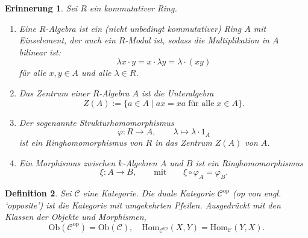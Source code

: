 \documentclass[a4paper, 11pt]{scrartcl}
\newcommand{\Hom}{\text{Hom}}
\newcommand{\Ob}{\text{Ob}}
\theoremstyle{basicstyle}
\newtheorem{definition}{Definition}[section]
\newtheorem{erinnerung}[definition]{Erinnerung}
\begin{document}
    \begin{erinnerung}
        Sei \(R\) ein kommutativer Ring.
        \begin{enumerate}
            \item Eine \emph{\(R\)-Algebra} ist ein (nicht unbedingt kommutativer) Ring \(A\) mit Einselement, der auch ein \(R\)-Modul ist, sodass die Multiplikation in \(A\) bilinear ist:
                \[\lambda x \cdot y = x \cdot \lambda y = \lambda \cdot (xy)\]
                für alle \(x,y \in A\) und alle \(\lambda \in R\).

            \item Das \emph{Zentrum} einer \(R\)-Algebra \(A\) ist die Unteralgebra
                \[Z(A) := \{a \in A \;\vert\; ax = xa \; \text{für alle} \; x \in A\}.\]

            \item Der sogenannte \emph{Strukturhomomorphismus} 
                \[\varphi: R \longrightarrow A, \qquad \lambda \mapsto \lambda \cdot 1_A\]
                ist ein Ringhomomorphismus von \(R\) in das Zentrum \(Z(A)\) von \(A\).

            \item Ein Morphismus zwischen \(k\)-Algebren \(A\) und \(B\) ist ein Ringhomomorphismus
                \[\xi: A \longrightarrow B, \qquad\text{mit}\qquad \xi \circ \varphi_A = \varphi_B.\]
        \end{enumerate}
    \end{erinnerung}

    \begin{definition}
        Sei \(\mathcal{C}\) eine Kategorie.
        Die \emph{duale Kategorie} \(\mathcal{C}^{\text{op}}\) (op von engl. `opposite') ist die Kategorie mit umgekehrten Pfeilen.
        Ausgedrückt mit den Klassen der Objekte und Morphismen,
        \[\Ob(\mathcal{C}^{\text{op}}) = \Ob(\mathcal{C}), \quad \Hom_{\mathcal{C}^{\text{op}}}(X, Y) = \Hom_{\mathcal{C}}(Y, X).\]
    \end{definition}
\end{document}

